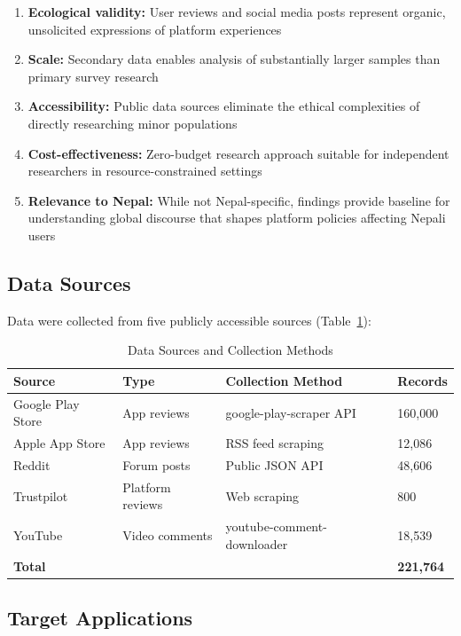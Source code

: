 \documentclass[11pt,a4paper]{article}
\begin{document}
\begin{enumerate}[leftmargin=*, itemsep=0.3em]
    \item \textbf{Ecological validity:} User reviews and social media posts represent organic, unsolicited expressions of platform experiences
    \item \textbf{Scale:} Secondary data enables analysis of substantially larger samples than primary survey research
    \item \textbf{Accessibility:} Public data sources eliminate the ethical complexities of directly researching minor populations
    \item \textbf{Cost-effectiveness:} Zero-budget research approach suitable for independent researchers in resource-constrained settings
    \item \textbf{Relevance to Nepal:} While not Nepal-specific, findings provide baseline for understanding global discourse that shapes platform policies affecting Nepali users
\end{enumerate}

\subsection{Data Sources}

Data were collected from five publicly accessible sources (Table~\ref{tab:data_sources}):

\begin{table}[H]
\centering
\caption{Data Sources and Collection Methods}
\label{tab:data_sources}
\begin{tabular}{llll}
\toprule
\textbf{Source} & \textbf{Type} & \textbf{Collection Method} & \textbf{Records} \\
\midrule
Google Play Store & App reviews & google-play-scraper API & 160,000 \\
Apple App Store & App reviews & RSS feed scraping & 12,086 \\
Reddit & Forum posts & Public JSON API & 48,606 \\
Trustpilot & Platform reviews & Web scraping & 800 \\
YouTube & Video comments & youtube-comment-downloader & 18,539 \\
\midrule
\textbf{Total} & & & \textbf{221,764} \\
\bottomrule
\end{tabular}
\end{table}

\subsection{Target Applications}
\end{document}
